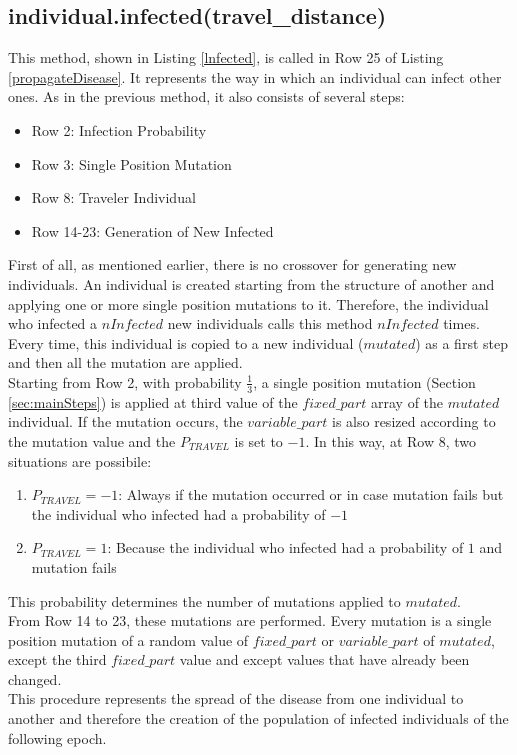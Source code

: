 \documentclass[letterpaper]{article}%
\begin{document}
\subsection{individual.infected(travel\_distance)}
This method, shown in Listing \ref{lnfected}, is called in Row 25 of Listing \ref{propagateDisease}. It represents the way in which an individual can infect other ones. As in the previous method, it also consists of several steps:
\begin{itemize}
\item Row 2: Infection Probability
\item Row 3: Single Position Mutation
\item Row 8: Traveler Individual
\item Row 14-23: Generation of New Infected
\end{itemize}
First of all, as mentioned earlier, there is no crossover for generating new individuals. An individual is created starting from the structure of another and applying one or more single position mutations to it. Therefore, the individual who infected a $nInfected$ new individuals calls this method $nInfected$ times. Every time, this individual is copied to a new individual ($mutated$) as a first step and then all the mutation are applied.\\
Starting from Row 2, with probability $\frac{1}{3}$, a single position mutation (Section \ref{sec:mainSteps}) is applied at third value of the $fixed\_part$ array of the $mutated$ individual. If the mutation occurs, the $variable\_part$ is also resized according to the mutation value and the $P_{TRAVEL}$ is set to $-1$.
In this way, at Row 8, two situations are possibile:
\begin{enumerate}[label=\arabic*)]
\item $P_{TRAVEL} = -1$: Always if the mutation occurred or in case mutation fails but the individual who infected had a probability of $-1$ 
\item $P_{TRAVEL} = 1$: Because the individual who infected had a probability of $1$ and mutation fails 
\end{enumerate}
This probability determines the number of mutations applied to $mutated$.\\
From Row 14 to 23, these mutations are performed. Every mutation is a single position mutation of a random value of $fixed\_part$ or $variable\_part$ of $mutated$, except the third $fixed\_part$ value and except values that have already been changed.\\
This procedure represents the spread of the disease from one individual to another and therefore the creation of the population of infected individuals of the following epoch.
\end{document}
